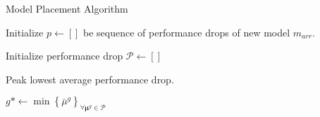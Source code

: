 
\begin{algorithm}[t]
	\caption{Model Placement Algorithm}
	\label{algo:model_placement}
	\SetAlgoLined
	{
		\begin{small}
			Initialize $p \gets []$ be sequence of performance drops of new model $m_{arr}$.

			Initialize performance drop $\mathcal{P} \gets []$




			Peak lowest average performance drop.

			$g* \gets \min \left\{ \bar{\mu}^g \right\}_{\forall \mathbf{\mu}^g \in \mathcal{P}}$

		\end{small}
	}
\end{algorithm}



